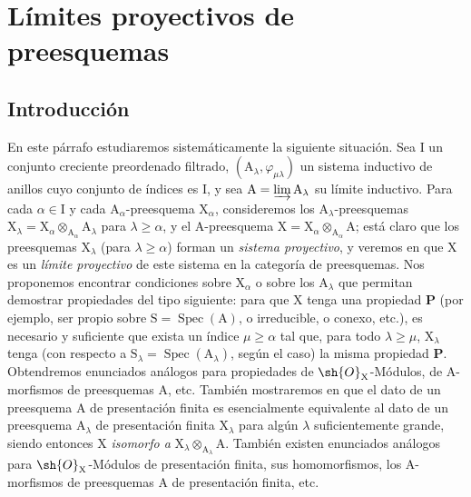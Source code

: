\section{Límites proyectivos de preesquemas}
\label{section:IV.8}

\subsection{Introducción}
\label{subsection:IV.8.1}


\begin{env}[8.1.1]
\label{IV.8.1.1}
En este párrafo estudiaremos sistemáticamente la siguiente situación.
Sea $\mathrm{I}$ un conjunto creciente preordenado filtrado, $(\mathrm{A}_\lambda,\varphi_{\mu\lambda})$ un sistema inductivo de anillos cuyo conjunto de índices es $\mathrm{I}$, y sea $\mathrm{A}=\varinjlim\mathrm{A}_\lambda$ su límite inductivo.
Para cada $\alpha\in\mathrm{I}$ y cada $\mathrm{A}_\alpha$-preesquema $\mathrm{X}_\alpha$, consideremos los $\mathrm{A}_\lambda$-preesquemas $\mathrm{X}_\lambda=\mathrm{X}_\alpha\otimes_{\mathrm{A}_\alpha}\mathrm{A}_\lambda$ para $\lambda\geqslant\alpha$, y el $\mathrm{A}$-preesquema $\mathrm{X}=\mathrm{X}_\alpha\otimes_{\mathrm{A}_\alpha}\mathrm{A}$; está claro que los preesquemas $\mathrm{X}_\lambda$ (para $\lambda\geqslant\alpha$) forman un \emph{sistema proyectivo}, y veremos en  que $\mathrm{X}$ es un \emph{límite proyectivo} de este sistema en la categoría de preesquemas.
Nos proponemos encontrar condiciones sobre $\mathrm{X}_\alpha$ o sobre los $\mathrm{A}_\lambda$ que permitan demostrar propiedades del tipo siguiente:
para que $\mathrm{X}$ tenga una propiedad $\mathbf{P}$ (por ejemplo, ser propio sobre $\mathrm{S}=\operatorname{Spec}(\mathrm{A})$, o irreducible, o conexo, etc.), es necesario y suficiente que exista un índice $\mu\geqslant\alpha$ tal que, para todo $\lambda\geqslant\mu$, $\mathrm{X}_\lambda$ tenga (con respecto a $\mathrm{S}_\lambda=\operatorname{Spec}(\mathrm{A}_\lambda)$, según el caso) la misma propiedad $\mathbf{P}$.
Obtendremos enunciados análogos para propiedades de $\sh{O}_\mathrm{X}$-Módulos, de $\mathrm{A}$-morfismos de preesquemas $\mathrm{A}$, etc.
También mostraremos en  que el dato de un preesquema $\mathrm{A}$ de presentación finita  es esencialmente equivalente al dato de un preesquema $\mathrm{A}_\lambda$ de presentación finita $\mathrm{X}_\lambda$ para algún $\lambda$ suficientemente grande, siendo entonces $\mathrm{X}$ \emph{isomorfo a} $\mathrm{X}_\lambda\otimes_{\mathrm{A}_\lambda}\mathrm{A}$.
También existen enunciados análogos para $\sh{O}_\mathrm{X}$-Módulos de presentación finita, sus homomorfismos, los $\mathrm{A}$-morfismos de preesquemas $\mathrm{A}$ de presentación finita, etc.
\end{env}

